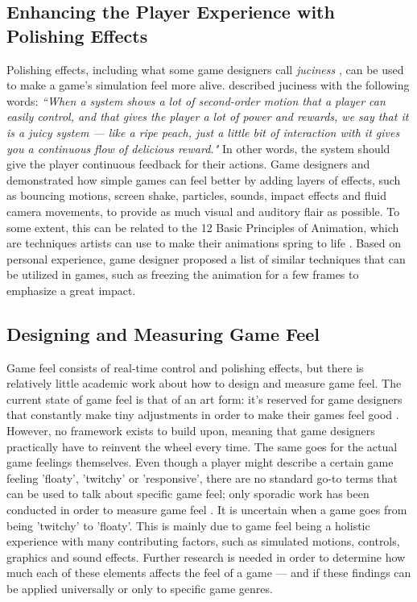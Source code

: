 \subsection{Enhancing the Player Experience with Polishing Effects}
Polishing effects, including what some game designers call \textit{juciness} \cite{juice3}, can be used to make a game's simulation feel more alive. \cite{schell_art_2008} described juciness with the following words: \textit{``When a system shows a lot of second-order motion that a player can easily control, and that gives the player a lot of power and rewards, we say that it is a juicy system --- like a ripe peach, just a little bit of interaction with it gives you a continuous flow of delicious reward."} In other words, the system should give the player continuous feedback for their actions. Game designers \cite{juice1} and \cite{juice2} demonstrated how simple games can feel better by adding layers of effects, such as bouncing motions, screen shake, particles, sounds, impact effects and fluid camera movements, to provide as much visual and auditory flair as possible. To some extent, this can be related to the 12 Basic Principles of Animation, which are techniques artists can use to make their animations spring to life \cite{animation}. Based on personal experience, game designer \cite{sticky} proposed a list of similar techniques that can be utilized in games, such as freezing the animation for a few frames to emphasize a great impact.


\subsection{Designing and Measuring Game Feel}
Game feel consists of real-time control and polishing effects, but there is relatively little academic work about how to design and measure game feel. The current state of game feel is that of an art form: it's reserved for game designers that constantly make tiny adjustments in order to make their games feel good \cite{meatboy1, meatboy2, juicyBeast, gameFeelTips}. However, no framework exists to build upon, meaning that game designers practically have to reinvent the wheel every time. The same goes for the actual game feelings themselves. Even though a player might describe a certain game feeling 'floaty', 'twitchy' or 'responsive', there are no standard go-to terms that can be used to talk about specific game feel; only sporadic work has been conducted in order to measure game feel \cite{feelBetter}. It is uncertain when a game goes from being 'twitchy' to 'floaty'. This is mainly due to game feel being a holistic experience with many contributing factors, such as simulated motions, controls, graphics and sound effects. Further research is needed in order to determine how much each of these elements affects the feel of a game --- and if these findings can be applied universally or only to specific game genres.